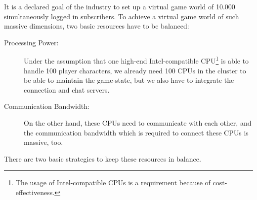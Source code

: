 \documentclass[a4paper, 10pt]{book}
\begin{document}
            It is a declared goal of the industry to set up a virtual game world of 10.000
            simultaneously logged in subscribers. To achieve a virtual game world of such
            massive dimensions, two basic resources have to be balanced:
            \begin{description}
                \item[Processing Power:] Under the assumption that one high-end Intel-compatible
                    CPU\footnote{The usage of Intel-compatible CPUs is a
                    requirement because of cost-effectiveness.} is able to handle 100
                    player characters, we already need 100 CPUs in the cluster
                    to be able to maintain the game-state, but we also have to integrate
                    the connection and chat servers.
                \item[Communication Bandwidth:] On the other hand, these CPUs need to
                    communicate with each other, and the communication bandwidth which
                    is required to connect these CPUs is massive, too.
            \end{description}
            There are two basic strategies to keep these resources in balance. 
\end{document}
